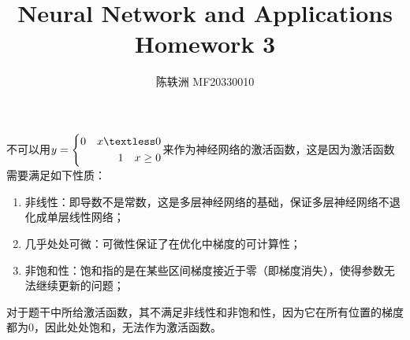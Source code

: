 \documentclass{article}
\title{Neural Network and Applications\\Homework 3}
\author{陈轶洲 MF20330010}
\begin{document}
	\maketitle
\section{}
不可以用$y = \left\{
\begin{aligned}
	0 \quad x \textless 0\\
	1 \quad x \ge 0
\end{aligned} 
\right. $来作为神经网络的激活函数，这是因为激活函数需要满足如下性质：
\begin{enumerate}[1)]
	\item 非线性：即导数不是常数，这是多层神经网络的基础，保证多层神经网络不退化成单层线性网络；
	\item 几乎处处可微：可微性保证了在优化中梯度的可计算性；
	\item 非饱和性：饱和指的是在某些区间梯度接近于零（即梯度消失），使得参数无法继续更新的问题；
\end{enumerate}
对于题干中所给激活函数，其不满足非线性和非饱和性，因为它在所有位置的梯度都为0，因此处处饱和，无法作为激活函数。
\end{document}
